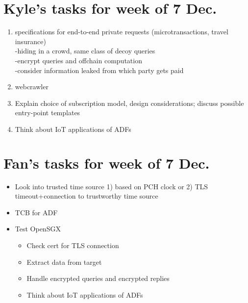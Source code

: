 \documentclass[letterpaper,twocolumn,10pt]{article}
\begin{document}
\section{Kyle's tasks for week of 7 Dec.}
\begin{enumerate}
\item specifications for end-to-end private requests (microtransactions, travel insurance)\\
-hiding in a crowd, same class of decoy queries\\
-encrypt queries and offchain computation \\
-consider information leaked from which party gets paid
\item webcrawler
\item Explain choice of subscription model, design considerations; discuss possible entry-point templates
\item Think about IoT applications of ADFs
\end{enumerate}

\section{Fan's tasks for week of 7 Dec.}
\begin{itemize}
\item Look into trusted time source 1) based on PCH clock or 2) TLS timeout+connection to trustworthy time source
\item TCB for ADF
\item Test OpenSGX
\begin{itemize}
\item Check cert for TLS connection
\item Extract data from target
\item Handle encrypted queries and encrypted replies
\item Think about IoT applications of ADFs
\end{itemize}
\end{itemize}
\end{document}
